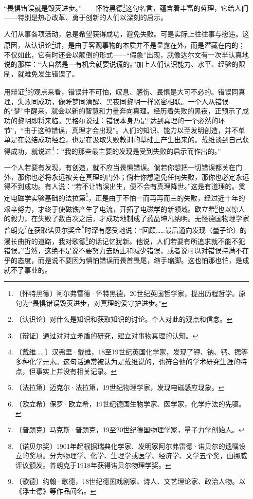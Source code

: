 \documentclass[12pt,UTF-8,openany]{ctexbook}
\begin{document}
\begin{large}
    
    “畏惧错误就是毁灭进步。”——怀特黑德\footnote{〔怀特黑德〕阿尔弗雷德·怀特黑德，20世纪英国哲学家，提出历程哲学。原句为“畏惧错误毁灭进步，对真理的爱守护进步。”}这句名言，蕴含着丰富的哲理，它给人们——特别是热心改革、勇于创新的人们以深刻的启示。
    
    人们从事各项活动，总是希望获得成功，避免失败。可是实际上往往事与愿违。这原因，从认识论\footnote{〔认识论〕对什么是知识和获取知识的讨论。个人对此的观点和信念。}讲，是由于客观事物的本质并不是显露在外，而是潜藏在内的；不仅如此，它有时还会以颠倒的形式——“假象”出现，就像达尔文有一次半认真地说的那样：“大自然是一有机会就要说谎的。”加上人们认识能力、水平、经验的限制，就难免发生错误了。
    
    用辩证\footnote{〔辩证〕通过对对立矛盾的研究，建立对事物真理的认知。}的观点来看，错误并不可怕，叹息、感伤、畏惧是大可不必的。错误同真理，失败同成功，像睡梦同清醒、黑夜同黎明一样紧密相联。一个人从错误的“梦”中醒来，就会以新的智慧和力量奔向真理。经历着失败的黑夜，正预示了成功的黎明即将来临。黑格尔说过：错误本身乃是“达到真理的一个必然的环节”，“由于这种错误，真理才会出现”。人们的知识、能力以至发明创造，并不单单是在总结成功经验，也是在汲取失败教训的基础上产生出来的。戴维谈到自己获得成功，就说过\footnote{〔戴维……〕汉弗里·戴维，18至19世纪英国化学家，发现了钾、钠、钙、锶等多种化学元素。这句话通常被认为是戴维说的，也符合他的学术研究生涯的特点，但事实上并没有相关记录。}：“我的那些最主要的发现是受到失败的启示而作出的。”
    
    一个人若要有发现，有创造，就不应当畏惧错误。倘若你想把一切错误都关在门外，那你也必将永远被关在真理的门外；倘若你想避免任何失败，那你也必定永远得不到成功。有人说：“若不让错误出生，便不会有真理降世。”这是有道理的。奠定电磁学实验基础的法拉第\footnote{〔法拉第〕迈克尔·法拉第，19世纪物理学家，发现电磁感应现象。}，正是由于不怕一而再再而三的失败，经过近十年的艰辛努力，才终于使磁铁产生了电流，开拓了电磁学的新领域。欧立希\footnote{〔欧立希〕保罗·欧立希，19世纪德国生物学家、医学家，化学疗法的先驱。}也以惊人的毅力，在失败了数百次之后，才成功地制成了药品坤凡纳明。无怪德国物理学家普朗克\footnote{〔普朗克〕马克斯·普朗克，19至20世纪德国物理学家，量子力学创始人。}在获取诺贝尔奖金\footnote{〔诺贝尔奖〕1901年起根据瑞典化学家、发明家阿尔弗雷德·诺贝尔的遗嘱设立的奖项。分为物理学、化学、生理学或医学、经济学、文学五个奖，由挪威评议颁发。普朗克于1918年获得诺贝尔物理学奖。}时深有感受地说：“回顾……最后通向发现（量子论）的漫长曲折的道路，我对歌德\footnote{〔歌德〕约翰·歌德，18世纪德国戏剧家、诗人、文艺理论家、政治人物。以《浮士德》等作品闻名。}的话记忆犹新。他说，人们若要有所追求就不能不犯错误。”当然，这绝不是说不要努力去防止和减少错误，或者说可以对错误持满不在乎的态度，而是说不要因为惧怕错误而畏首畏尾，缩手缩脚。这也怕那也怕，是成就不了事业的。
    

\end{large}
\end{document}
